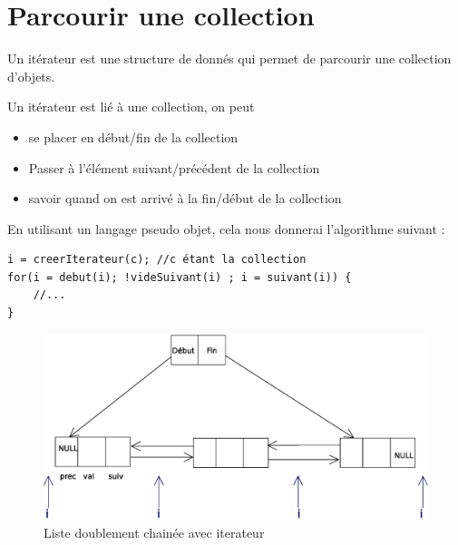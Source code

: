 \chapter{Parcourir une collection}
Un itérateur est une structure de donnés qui permet de parcourir une collection d'objets.

Un itérateur est lié à une collection, on peut 
\begin{itemize}
	\item se placer en début/fin de la collection
	\item Passer à l'élément suivant/précédent de la collection
	\item savoir quand on est arrivé à la fin/début de la collection
\end{itemize}

En utilisant un langage pseudo objet, cela nous donnerai l'algorithme suivant : 
\begin{lstlisting}[numbers=none]
i = creerIterateur(c); //c étant la collection
for(i = debut(i); !videSuivant(i) ; i = suivant(i)) {
	//...
}
\end{lstlisting}

\begin{figure}[H]
\centering
\includegraphics[width=15cm]{content/schemas/iterateur.eps}
\caption{Liste doublement chainée avec iterateur}
\end{figure}
